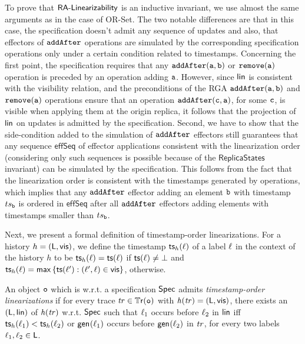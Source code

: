 To prove that $\mathsf{RA\text{-}Linearizability{}}$ is an inductive invariant, we use almost the same arguments as in the case of OR-Set. The two notable differences are that in this case, the specification doesn't admit any sequence of updates and also, that effectors of ${\tt addAfter}$ operations are simulated by the corresponding specification operations only under a certain condition related to timestamps. Concerning the first point, the specification requires that any $\alabelshort[{\tt addAfter}]{a,b}$ or $\alabelshort[{\tt remove}]{a}$ operation is preceded by an operation adding ${\tt a}$. However, since $\mathsf{lin}$ is consistent with the visibility relation, and the preconditions of the RGA $\alabelshort[{\tt addAfter}]{a,b}$ and $\alabelshort[{\tt remove}]{a}$ operations ensure that an operation $\alabelshort[{\tt addAfter}]{c,a}$, for some ${\tt c}$, is visible when applying them at the origin replica, it follows that the projection of $\mathsf{lin}$ on updates is admitted by the specification. Second, we have to show that the side-condition added to the simulation of ${\tt addAfter}$ effectors still guarantees that any sequence $\mathsf{effSeq}$ of effector applications consistent with the linearization order (considering only such sequences is possible because of the $\mathsf{ReplicaStates}$ invariant) can be simulated by the specification. This follows from the fact that the linearization order is consistent with the timestamps generated by operations, which implies that any ${\tt addAfter}$ effector adding an element ${\tt b}$ with timestamp $ts_{\tt b}$ is ordered in $\mathsf{effSeq}$ after all ${\tt addAfter}$ effectors adding elements with timestamps smaller than $ts_{\tt b}$.

Next, we present a formal definition of timestamp-order linearizations. For a history ${h}=(\mathsf{L},\mathsf{vis})$, we define the timestamp $\mathsf{ts}_{{h}}(\ell)$ of a label $\ell$ in the context of the history $h$ to be $\mathsf{ts}_{{h}}(\ell)=\mathsf{ts}(\ell)$ if $\mathsf{ts}(\ell)\neq\bot$ and $\mathsf{ts}_{{h}}(\ell)=\mathsf{max}\, \{\mathsf{ts}(\ell'):(\ell',\ell)\in \mathsf{vis} \}$, otherwise.

\begin{definition}
An object $\mathtt{o}$ which is \crdtlinearizable{} w.r.t. a specification $\mathsf{Spec}$ admits \emph{timestamp-order linearizations} if for every trace $\mathit{tr}\in\mathbb{T}\mathsf{r}(\mathtt{o})$ with $\mathit{h}({\mathit{tr})}=(\mathsf{L},\mathsf{vis})$, there exists an \crdtlinearization{} $(\mathsf{L},\mathsf{lin})$ of $\mathit{h}({\mathit{tr})}$ w.r.t. $\mathsf{Spec}$ such that $\ell_1$ occurs before $\ell_2$ in $\mathsf{lin}$ iff $\mathsf{ts}_{{h}}(\ell_1) < \mathsf{ts}_{{h}}(\ell_2)$ or $\mathsf{gen}_{}(\ell_1)$ occurs before $\mathsf{gen}_{}(\ell_2)$ in $\mathit{tr}$, for every two labels $\ell_1,\ell_2\in\mathsf{L}$.
\end{definition}

